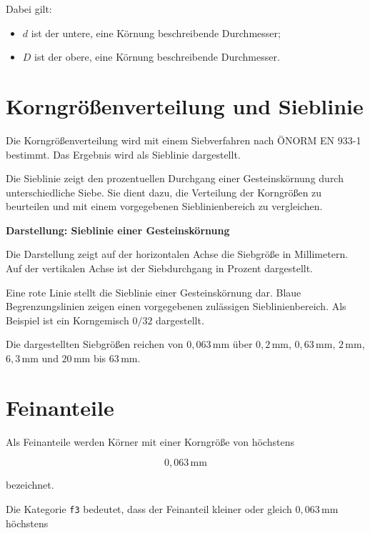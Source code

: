 \documentclass[
  12pt,
  a4paper,
  oneside
]{scrreprt}
\begin{document}
Dabei gilt:

\begin{itemize}
  \item $d$ ist der untere, eine Körnung beschreibende Durchmesser;
  \item $D$ ist der obere, eine Körnung beschreibende Durchmesser.
\end{itemize}



\section{Korngrößenverteilung und Sieblinie}

Die Korngrößenverteilung wird mit einem Siebverfahren nach
ÖNORM EN 933-1 bestimmt. Das Ergebnis wird als Sieblinie dargestellt.


Die Sieblinie zeigt den prozentuellen Durchgang einer Gesteinskörnung
durch unterschiedliche Siebe. Sie dient dazu, die Verteilung der
Korngrößen zu beurteilen und mit einem vorgegebenen
Sieblinienbereich zu vergleichen.


\begin{darstellungsbox}
\textbf{Darstellung: Sieblinie einer Gesteinskörnung}

Die Darstellung zeigt auf der horizontalen Achse die Siebgröße in
Millimetern. Auf der vertikalen Achse ist der Siebdurchgang in Prozent
dargestellt.

Eine rote Linie stellt die Sieblinie einer Gesteinskörnung dar. Blaue
Begrenzungslinien zeigen einen vorgegebenen zulässigen
Sieblinienbereich. Als Beispiel ist ein Korngemisch $0/32$ dargestellt.

Die dargestellten Siebgrößen reichen von $0{,}063\,\mathrm{mm}$ über
$0{,}2\,\mathrm{mm}$, $0{,}63\,\mathrm{mm}$, $2\,\mathrm{mm}$,
$6{,}3\,\mathrm{mm}$ und $20\,\mathrm{mm}$ bis
$63\,\mathrm{mm}$.
\end{darstellungsbox}

\section{Feinanteile}

Als Feinanteile werden Körner mit einer Korngröße von höchstens

\begin{equation}
  0{,}063\,\mathrm{mm}
\end{equation}

bezeichnet. 

Die Kategorie \texttt{f3} bedeutet, dass der Feinanteil kleiner oder
gleich $0{,}063\,\mathrm{mm}$ höchstens
\end{document}
